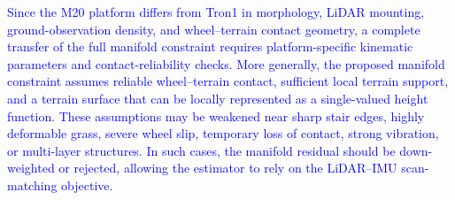 \documentclass[journal,twoside,web]{ieeecolor}
\newcommand{\cs}[1]{\textcolor{blue}{#1}}
\begin{document}
\cs{Since the M20 platform differs from Tron1 in morphology, LiDAR mounting, ground-observation density, and wheel--terrain contact geometry, a complete transfer of the full manifold constraint requires platform-specific kinematic parameters and contact-reliability checks. More generally, the proposed manifold constraint assumes reliable wheel--terrain contact, sufficient local terrain support, and a terrain surface that can be locally represented as a single-valued height function. These assumptions may be weakened near sharp stair edges, highly deformable grass, severe wheel slip, temporary loss of contact, strong vibration, or multi-layer structures. In such cases, the manifold residual should be down-weighted or rejected, allowing the estimator to rely on the LiDAR--IMU scan-matching objective.}

\end{document}
